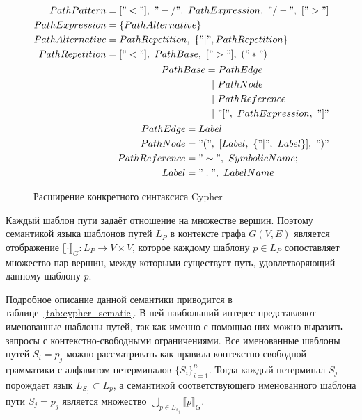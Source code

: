 \documentclass[14pt]{matmex-diploma-custom}
\begin{document}
\begin{figure}[]
\begin{align*}
\begin{split}
PathPattern     &= ["<"],~"-/",~PathExpression,~"/-",~[">"]\\
PathExpression  &= \{PathAlternative\}\\
PathAlternative &= PathRepetition,~\{"|", PathRepetition\}\\
PathRepetition  &= ["<"],~PathBase,~[">"],~("*")
\end{split}\\
\begin{split}
PathBase &= PathEdge \\
         &~~|~PathNode \\
         &~~|~PathReference \\
         &~~|~"[",~PathExpression,~"]"
\end{split}\\
\begin{split}
PathEdge      &= Label \\
PathNode      &= "(",~[Label,~\{"|",~Label\}],~")" \\
PathReference &= "\sim",~SymbolicName; \\
Label         &= ":",~LabelName
\end{split}
\end{align*}
\caption{Расширение конкретного синтаксиса Cypher}
\label{fig:cypher_syntax}
\end{figure}

Каждый шаблон пути задаёт отношение на множестве вершин. Поэтому семантикой языка шаблонов путей $L_{P}$ в контексте графа $G(V, E)$ является отображение $\llbracket \cdot \rrbracket_{G}: L_P \rightarrow V \times V$, которое каждому шаблону $p\in L_P$ сопоставляет множество пар вершин, между которыми существует путь, удовлетворяющий данному шаблону $p$. 

Подробное описание данной семантики приводится в таблице~\ref{tab:cypher_sematic}.  В ней наибольший интерес представляют именованные шаблоны путей, так как именно с помощью них можно выразить запросы с контекстно-свободными ограничениями. Все именованные шаблоны путей $S_i = p_j$ можно рассматривать как правила контекстно свободной грамматики с алфавитом нетерминалов $\{S_i\}_{i=1}^n$. Тогда каждый нетерминал $S_j$ порождает язык $L_{S_j} \subset L_p$, а семантикой соответствующего именованного шаблона пути $S_j=p_j$ является множество $\bigcup\limits_{p \in L_{s_j}} \llbracket p \rrbracket_{G}$.
\end{document}
